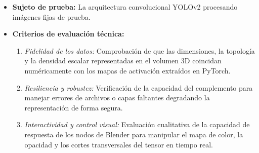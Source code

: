 \begin{itemize}
    \item \textbf{Sujeto de prueba:} La arquitectura convolucional YOLOv2 procesando imágenes fijas de prueba.
    \item \textbf{Criterios de evaluación técnica:} 
    \begin{enumerate}
        \item \textit{Fidelidad de los datos:} Comprobación de que las dimensiones, la topología y la densidad 
        escalar representadas en el volumen 3D coincidan numéricamente con los mapas de activación extraídos en 
        PyTorch.
        \item \textit{Resiliencia y robustez:} Verificación de la capacidad del complemento para manejar errores 
        de archivos o capas faltantes degradando la representación de forma segura.
        \item \textit{Interactividad y control visual:} Evaluación cualitativa de la capacidad de respuesta de 
        los nodos de Blender para manipular el mapa de color, la opacidad y los cortes transversales del tensor 
        en tiempo real.
    \end{enumerate}
\end{itemize}